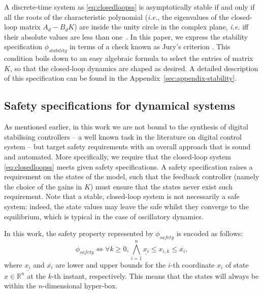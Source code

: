 \documentclass[runningheads,a4paper]{llncs}
\newcommand{\addtodo}[1]{{\color{red} TODO: #1}}
\begin{document}
A discrete-time system as \eqref{eq:closedloopss} is asymptotically stable if and only if all the roots 
of the characteristic polynomial ({\it i.e.}, the eigenvalues of the closed-loop matrix $A_d - B_d K$) are inside the unity circle in the complex plane, 
{\it i.e.} iff their absolute values are less than one~\cite{astrom1997computer}. 
In this paper, we express the stability specification $\phi_{stability}$ in terms of a check known as Jury's criterion \cite{fadali}. 
This condition boils down to an easy algebraic formula to select the entries of matrix $K$, 
so that the closed-loop dynamics are shaped as desired. 
A detailed description of this specification can be found in the Appendix~\ref{sec:appendix-stability}. 

\subsection{Safety specifications for dynamical systems}
\label{ssec:safety}

As mentioned earlier, 
in this work we are not bound to the synthesis of digital stabilising controllers -- 
a well known task in the literature on digital control system -- 
but target safety requirements with an overall approach that is sound and automated. 
More specifically, 
we require that the closed-loop system \eqref{eq:closedloopss} meets given safety specifications. 
A safety specification raises a requirement on the states of the model, 
such that the feedback controller (namely the choice of the gains in $K$) 
must ensure that the states never exist such requirement. 
Note that a stable, closed-loop system is not necessarily a safe system: 
indeed, the state values may leave the safe whilst they converge to the equilibrium, 
which is typical in the case of oscillatory dynamics. 

In this work, the safety property represented by $\phi_{safety}$ is encoded as follows: 
%
\begin{equation}
\label{eq:safetyliteral}
\phi_{safety}\iff \forall k\geq 0, \bigwedge_{i=1}^{n}{\underline{x_{i}} \leq x_{i,k} \leq \overline{x_{i}}},
\end{equation}
%
where $\underline{x_{i}}$ and $\overline{x_{i}}$ are lower and upper bounds for the $i$-th coordinate $x_{i}$ of state $x\in \mathbb R^n$ at the $k$-th instant, respectively. 
This means that the states will always be within the $n$-dimensional hyper-box. 
\end{document}
